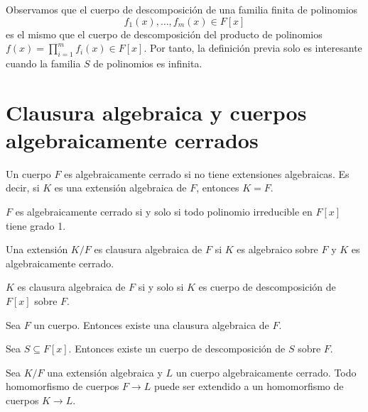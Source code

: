 \begin{remark}
    Observamos que el cuerpo de descomposición de una familia finita de polinomios
    $$f_1(x), \dots, f_m(x) \in F[x]$$
    es el mismo que el cuerpo de descomposición del producto de polinomios $f(x) = \prod_{i = 1}^m f_i(x) \in F[x]$.
    Por tanto, la definición previa solo es interesante cuando la familia $S$ de polinomios es infinita.
\end{remark}

\section{Clausura algebraica y cuerpos algebraicamente cerrados}

\begin{definition}
    Un cuerpo $F$ es algebraicamente cerrado si no tiene extensiones algebraicas.
    Es decir, si $K$ es una extensión algebraica de $F$, entonces $K = F$.
\end{definition}

\begin{proposition}
    $F$ es algebraicamente cerrado si y solo si todo polinomio irreducible en $F[x]$ tiene grado 1.
\end{proposition}

\begin{definition}
    Una extensión $K/F$ es clausura algebraica de $F$ si $K$ es algebraico sobre $F$ y $K$ es algebraicamente cerrado.
\end{definition}

\begin{proposition}
    $K$ es clausura algebraica de $F$ si y solo si $K$ es cuerpo de descomposición de $F[x]$ sobre $F$.
\end{proposition}

\begin{theorem}
    Sea $F$ un cuerpo. Entonces existe una clausura algebraica de $F$.
\end{theorem}

\begin{corollary}
    Sea $S \subseteq F[x]$. Entonces existe un cuerpo de descomposición de $S$ sobre $F$.
\end{corollary}

\begin{theorem}
    Sea $K/F$ una extensión algebraica y $L$ un cuerpo algebraicamente cerrado.
    Todo homomorfismo de cuerpos $F \to L$ puede ser extendido a un homomorfismo de cuerpos $K \to L$.
\end{theorem}

